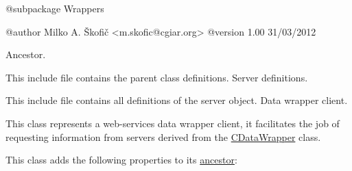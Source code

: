 \begin{DoxyVerb}    @subpackage     Wrappers

    @author         Milko A. Škofič <m.skofic@cgiar.org>
    @version        1.00 31/03/2012\end{DoxyVerb}


Ancestor.

This include file contains the parent class definitions. Server definitions.

This include file contains all definitions of the server object. Data wrapper client.

This class represents a web-\/services data wrapper client, it facilitates the job of requesting information from servers derived from the \hyperlink{class_c_data_wrapper}{C\-Data\-Wrapper} class.

This class adds the following properties to its \hyperlink{class_c_wrapper_client}{ancestor}\-:



